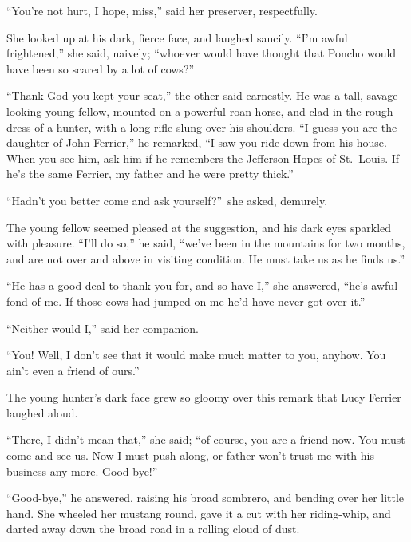 \documentclass[12pt,english,oneside]{book}
\begin{document}
{}``You're not hurt, I hope, miss,'' said her preserver, respectfully.

She looked up at his dark, fierce face, and laughed saucily. {}``I'm
awful frightened,'' she said, naively; {}``whoever would have thought
that Poncho would have been so scared by a lot of cows?''

{}``Thank God you kept your seat,'' the other said earnestly. He
was a tall, savage-looking young fellow, mounted on a powerful roan
horse, and clad in the rough dress of a hunter, with a long rifle
slung over his shoulders. {}``I guess you are the daughter of John
Ferrier,'' he remarked, {}``I saw you ride down from his house.
When you see him, ask him if he remembers the Jefferson Hopes of St.\ Louis.
If he's the same Ferrier, my father and he were pretty thick.''

{}``Hadn't you better come and ask yourself?''\ she asked, demurely.

The young fellow seemed pleased at the suggestion, and his dark eyes
sparkled with pleasure. {}``I'll do so,'' he said, {}``we've been
in the mountains for two months, and are not over and above in visiting
condition. He must take us as he finds us.''

{}``He has a good deal to thank you for, and so have I,'' she answered,
{}``he's awful fond of me. If those cows had jumped on me he'd have
never got over it.''

{}``Neither would I,'' said her companion.

{}``You! Well, I don't see that it would make much matter to you,
anyhow. You ain't even a friend of ours.''

The young hunter's dark face grew so gloomy over this remark that
Lucy Ferrier laughed aloud.

{}``There, I didn't mean that,'' she said; {}``of course, you are
a friend now. You must come and see us. Now I must push along, or
father won't trust me with his business any more. Good-bye!''

{}``Good-bye,'' he answered, raising his broad sombrero, and bending
over her little hand. She wheeled her mustang round, gave it a cut
with her riding-whip, and darted away down the broad road in a rolling
cloud of dust.
\end{document}
